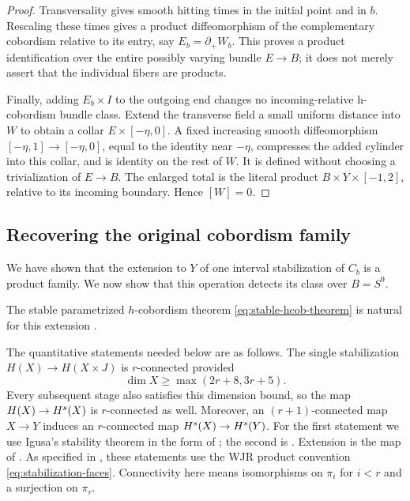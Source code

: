 \begin{proof}
Transversality gives smooth hitting times in the initial point and in $b$. Rescaling these times gives a product diffeomorphism of the complementary cobordism relative to its entry, say $E_b=\partial_+W_b$. This proves a product identification over the entire possibly varying bundle $E\to B$; it does not merely assert that the individual fibers are products.

Finally, adding $E_b\times I$ to the outgoing end changes no incoming-relative h-cobordism bundle class. Extend the transverse field a small uniform distance into $W$ to obtain a collar $E\times[-\eta,0]$. A fixed increasing smooth diffeomorphism $[-\eta,1]\to[-\eta,0]$, equal to the identity near $-\eta$, compresses the added cylinder into this collar, and is identity on the rest of $W$. It is defined without choosing a trivialization of $E\to B$. The enlarged total is the literal product $B\times Y\times[-1,2]$, relative to its incoming boundary. Hence $[W]=0$.
\end{proof}

\subsection{Recovering the original cobordism family}

We have shown that the extension to $Y$ of one interval stabilization
of $C_b$ is a product family. We now show that this operation detects
its class over $B=S^9$.

The stable parametrized $h$-cobordism theorem
\eqref{eq:stable-hcob-theorem} is natural for this extension
\cite[Theorems~0.1 and~0.3]{WJR2013}.

The quantitative statements needed below are as follows. The single
stabilization $H(X)\to H(X\times J)$ is $r$-connected provided
\begin{equation}\label{eq:igusa-range}
 \dim X\geq\max(2r+8,3r+5).
\end{equation}
Every subsequent stage also satisfies this dimension bound, so the map
$H(X)\to H^s(X)$ is $r$-connected as well. Moreover, an
$(r+1)$-connected map $X\to Y$ induces an $r$-connected map
$H^s(X)\to H^s(Y)$. For the first statement we use Igusa's stability
theorem \cite{Igusa1988} in the form of
\cite[Theorem~2.16]{CP2025}; the second is
\cite[Theorem~2.17]{CP2025}. Extension is the map of
\cite[Definition~2.15]{CP2025}. As specified in
\cite[Remark~2.13]{CP2025}, these statements use the WJR product
convention \eqref{eq:stabilization-faces}. Connectivity here means isomorphisms on
$\pi_i$ for $i<r$ and a surjection on $\pi_r$.

